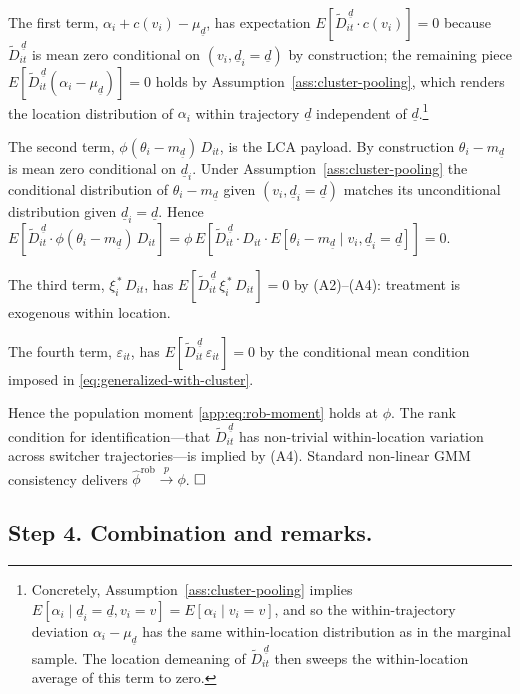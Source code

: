 The first term, $\alpha_i + c(v_i) - \mu_{\underline d}$, has expectation $E[\tilde D_{it}^{\,\underline d}\cdot c(v_i)] = 0$ because $\tilde D_{it}^{\,\underline d}$ is mean zero conditional on $(v_i, \underline d_i = \underline d)$ by construction; the remaining piece $E[\tilde D_{it}^{\,\underline d}(\alpha_i - \mu_{\underline d})] = 0$ holds by Assumption~\ref{ass:cluster-pooling}, which renders the location distribution of $\alpha_i$ within trajectory $\underline d$ independent of $\underline d$.\footnote{Concretely, Assumption~\ref{ass:cluster-pooling} implies $E[\alpha_i \mid \underline d_i = \underline d, v_i = v] = E[\alpha_i \mid v_i = v]$, and so the within-trajectory deviation $\alpha_i - \mu_{\underline d}$ has the same within-location distribution as in the marginal sample. The location demeaning of $\tilde D_{it}^{\,\underline d}$ then sweeps the within-location average of this term to zero.}

The second term, $\phi(\theta_i - m_{\underline d})\,D_{it}$, is the LCA payload.
By construction $\theta_i - m_{\underline d}$ is mean zero conditional on $\underline d_i$.
Under Assumption~\ref{ass:cluster-pooling} the conditional distribution of $\theta_i - m_{\underline d}$ given $(v_i, \underline d_i = \underline d)$ matches its unconditional distribution given $\underline d_i = \underline d$.
Hence $E[\tilde D_{it}^{\,\underline d}\cdot \phi(\theta_i - m_{\underline d})\,D_{it}] = \phi\,E[\tilde D_{it}^{\,\underline d}\cdot D_{it}\cdot E[\theta_i - m_{\underline d} \mid v_i,\underline d_i = \underline d]] = 0$.

The third term, $\xi_i^{\,*}\,D_{it}$, has $E[\tilde D_{it}^{\,\underline d}\,\xi_i^{\,*}\,D_{it}] = 0$ by (A2)--(A4): treatment is exogenous within location.

The fourth term, $\varepsilon_{it}$, has $E[\tilde D_{it}^{\,\underline d}\,\varepsilon_{it}] = 0$ by the conditional mean condition imposed in \eqref{eq:generalized-with-cluster}.

Hence the population moment \eqref{app:eq:rob-moment} holds at $\phi$.
The rank condition for identification---that $\tilde D_{it}^{\,\underline d}$ has non-trivial within-location variation across switcher trajectories---is implied by (A4).
Standard non-linear GMM consistency \citep{hansen1982large} delivers $\hat\phi^{\mathrm{rob}} \xrightarrow{p} \phi$. $\hfill\square$

\subsection*{Step 4.  Combination and remarks.}

